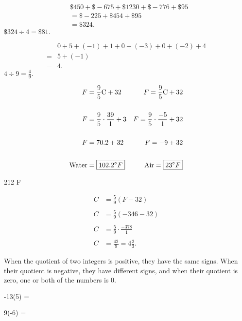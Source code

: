 \documentclass[12pt]{article}
\newenvironment{problem}[2][Problem]{\begin{trivlist}
\item[\hskip \labelsep {\bfseries #1}\hskip \labelsep {\bfseries #2.}]}{\end{trivlist}}
\begin{document}
\begin{problem}{50}
\begin{align*}
    &\$450 + \$-675 + \$1230 + \$-776  + \$95 \\
    &= \$-225 + \$454 + \$95 \\
    &= \$324.
\end{align*}
$\$324 \div 4 = \boxed{\$81.}$
\end{problem}

\begin{problem}{51}
\begin{align*}
    &0 + 5 + (-1) + 1 + 0 + (-3) + 0 + (-2) + 4 \\
    = &5 + (-1)\\
    = &4.
\end{align*}
$4 \div 9 = \boxed{\frac{4}{9}.}$
\end{problem}

\begin{problem}{52}
\begin{align*}
    F &= \frac{9}{5}\text{C} + 32 &F = \frac{9}{5}\text{C} + 32\\ \\
    F &= \frac{9}{5} \cdot \frac{39}{1} + 3 &F = \frac{9}{5} \cdot \frac{-5}{1} + 32\\\\
    F &= 70.2 + 32 &F = -9 + 32  \\\\
    \text{Water} &=\boxed{102.2\degree F}   &\text{Air} = \boxed{23\degree F}
\end{align*}
\end{problem}

\begin{problem}{53}
212 \degree F
\end{problem}

\begin{problem}{54}
\begin{align*}
    C &= \frac{5}{9}(F - 32) \\\\
    C &= \frac{5}{9}(-346 - 32) \\\\
    C &= \frac{5}{9} \cdot \frac{-378}{1} \\\\
    C &= \frac{42}{9} = \boxed{4\frac{2}{3}.}
\end{align*}
\end{problem}

\begin{problem}{55}
When the quotient of two integers is positive, they have the same signs. When their quotient is negative, they have different signs, and when their quotient is zero, one or both of the numbers is 0.
\end{problem}

\begin{problem}{60}
-13(5) = 
\end{problem}

\begin{problem}{61}
9(-6) = 
\end{problem}

\begi
\end{document}
